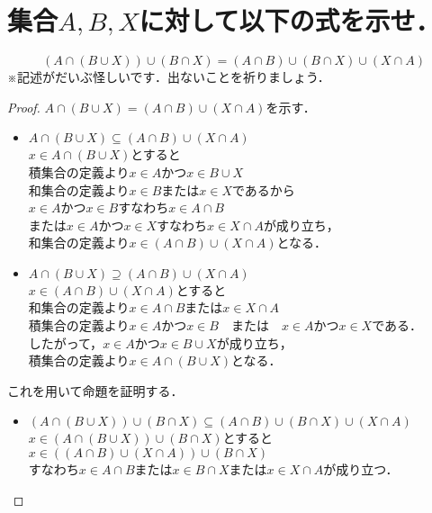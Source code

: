 \documentclass[a4paper,12pt]{ltjsarticle}
\begin{document}
\section{集合$A, B, X$に対して以下の式を示せ．}
\begin{equation*}
    (A \cap (B \cup X)) \cup (B \cap X) = (A \cap B) \cup (B \cap X) \cup (X \cap A)
\end{equation*}
※記述がだいぶ怪しいです．出ないことを祈りましょう．
\begin{proof}
    $A \cap (B \cup X) = (A \cap B) \cup (X \cap A)$を示す．
    \begin{itemize}
        \item $A \cap (B \cup X) \subseteq (A \cap B) \cup (X \cap A)$ \\
            $x \in A \cap (B \cup X)$とすると \\
            積集合の定義より$x \in A$かつ$x \in B \cup X$ \\
            和集合の定義より$x \in B$または$x \in X$であるから \\
            $x \in A$かつ$x \in B$すなわち$x \in A \cap B$ \\
            または$x \in A$かつ$x \in X$すなわち$x \in X \cap A$が成り立ち， \\
            和集合の定義より$x \in (A \cap B) \cup (X \cap A)$となる．
        \item $A \cap (B \cup X) \supseteq (A \cap B) \cup (X \cap A)$ \\
            $x \in (A \cap B) \cup (X \cap A)$とすると \\
            和集合の定義より$x \in A \cap B$または$x \in X \cap A$ \\
            積集合の定義より$x \in A$かつ$x \in B$　または　$x \in A$かつ$x \in X$である． \\
            したがって，$x \in A$かつ$x \in B \cup X$が成り立ち， \\
            積集合の定義より$x \in A \cap (B \cup X)$となる．
    \end{itemize}
    これを用いて命題を証明する．
    \begin{itemize}
        \item $(A \cap (B \cup X)) \cup (B \cap X) \subseteq (A \cap B) \cup (B \cap X) \cup (X \cap A)$ \\
            $x \in (A \cap (B \cup X)) \cup (B \cap X)$とすると \\
            $x \in ((A \cap B) \cup (X \cap A)) \cup (B \cap X)$ \\
            すなわち$x \in A \cap B$または$x \in B \cap X$または$x \in X \cap A$が成り立つ． \\

\end{itemize}
\end{proof}
\end{document}
